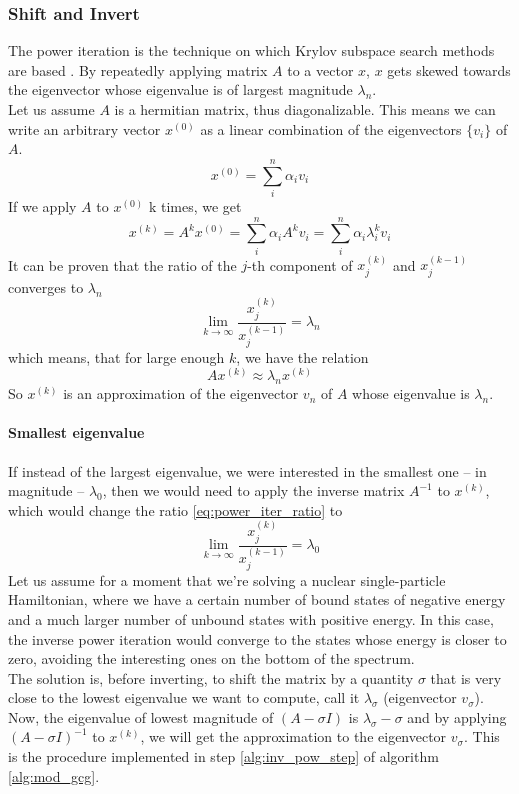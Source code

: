 \subsubsection{Shift and Invert}
\label{sec:shift_invert}
The power iteration is the technique on which Krylov subspace search methods are based \cite{golub13}. By repeatedly applying matrix $A$ to a vector $x$, $x$ gets skewed towards the eigenvector whose eigenvalue is of largest magnitude $\lambda_n$.
\\Let us assume $A$ is a hermitian matrix, thus diagonalizable. This means we can write an arbitrary vector $x^{(0)}$ as a linear combination of the eigenvectors $\{v_i\}$ of $A$.
\begin{equation}
    x^{(0)} = \sum_i^n \alpha_i v_i
\end{equation}
If we apply $A$ to $x^{(0)}$ k times, we get
\begin{equation}
    x^{(k)} = A^k x^{(0)} = \sum_i^n \alpha_i A^k v_i = \sum_i^n \alpha_i\lambda_i ^{k}v_i
\end{equation}
It can be proven that the ratio of the $j$-th component of $x_j^{(k)}$ and $x_j^{(k-1)}$ converges to $\lambda_n$
\begin{equation}
    \label{eq:power_iter_ratio}
    \lim_{k\to\infty} \frac{x_j^{(k)}}{x_j^{(k-1)}} = \lambda_n
\end{equation}
which means, that for large enough $k$, we have the relation
\begin{equation}
    \label{eq:power_iter_lambda}
    A x^{(k)} \approx \lambda_n x^{(k)}
\end{equation}
So $x^{(k)}$ is an approximation of the eigenvector $v_n$ of $A$ whose eigenvalue is $\lambda_n$.
\paragraph{Smallest eigenvalue}
If instead of the largest eigenvalue, we were interested in the smallest one -- in magnitude -- $\lambda_0$, then we would need to apply the inverse matrix $A^{-1}$ to $x^{(k)}$, which would change the ratio \eqref{eq:power_iter_ratio} to 
\begin{equation}
    \label{eq:power_iter_ratio_inv}
    \lim_{k\to\infty} \frac{x_j^{(k)}}{x_j^{(k-1)}} = \lambda_0
\end{equation}
Let us assume for a moment that we're solving a nuclear single-particle Hamiltonian, where we have a certain number of bound states of negative energy and a much larger number of unbound states with positive energy. In this case, the inverse power iteration would converge to the states whose energy is closer to zero, avoiding the interesting ones on the bottom of the spectrum.
\\The solution is, before inverting, to shift the matrix by a quantity $\sigma$ that is very close to the lowest eigenvalue we want to compute, call it $\lambda_\sigma$ (eigenvector $v_\sigma$).
Now, the eigenvalue of lowest magnitude of $(A-\sigma I)$ is $\lambda_\sigma - \sigma$ and by applying $(A-\sigma I)^{-1}$ to $x^{(k)}$, we will get the approximation to the eigenvector $v_\sigma$. This is the procedure implemented in step \ref{alg:inv_pow_step} of algorithm \ref{alg:mod_gcg}.
